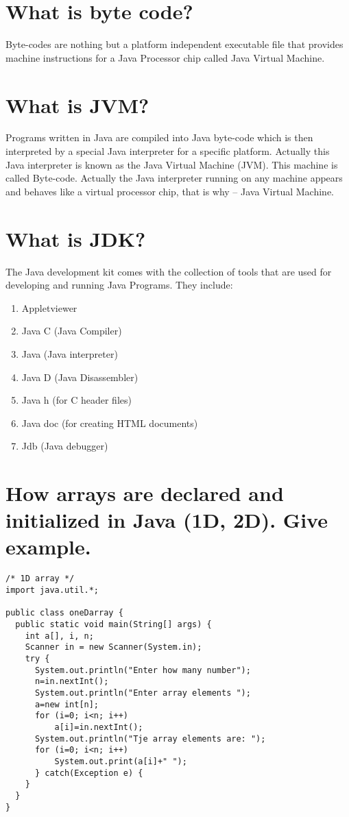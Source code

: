 \documentclass{article}
\begin{document}
{\section{What is byte code?}
Byte-codes are nothing but a platform independent executable file that provides machine instructions for a Java Processor chip called Java Virtual Machine.

\section{What is JVM?}
Programs written in Java are compiled into Java byte-code which is then interpreted by a special Java interpreter for a specific platform. Actually this Java interpreter is known as the Java Virtual Machine (JVM). This machine is called Byte-code. Actually the Java interpreter running on any
machine appears and behaves like a virtual processor chip, that is why -- Java Virtual Machine.
\section{What is JDK?}
The Java development kit comes with the collection of tools that are used for developing and running Java Programs. They include:

\begin{enumerate}
  \item Appletviewer
  \item Java C (Java Compiler)
  \item Java (Java interpreter)
  \item Java D (Java Disassembler)
  \item Java h (for C header files)
  \item Java doc (for creating HTML documents)
  \item Jdb (Java debugger)
\end{enumerate}

\section{How arrays are declared and initialized in Java (1D, 2D). Give example.}
\begin{lstlisting}
/* 1D array */
import java.util.*;

public class oneDarray {
  public static void main(String[] args) {
    int a[], i, n;
    Scanner in = new Scanner(System.in);
    try {
      System.out.println("Enter how many number");
      n=in.nextInt();
      System.out.println("Enter array elements ");
      a=new int[n];
      for (i=0; i<n; i++)
          a[i]=in.nextInt();
      System.out.println("Tje array elements are: ");
      for (i=0; i<n; i++)
          System.out.print(a[i]+" ");
      } catch(Exception e) {
    }
  }
}



\end{lstlisting}}
\end{document}
